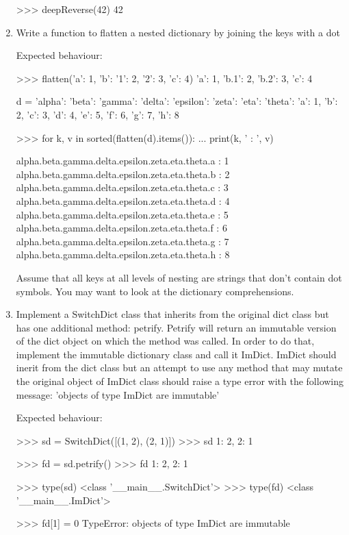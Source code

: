 \documentclass[]{article}
\begin{document}
\begin{enumerate}
>>> deepReverse(42)
42

\item

Write a function to flatten a nested dictionary by joining the keys with a dot

Expected behaviour:

>>> flatten({'a': 1, 'b': {'1': 2, '2': 3}, 'c': 4})
{'a': 1, 'b.1': 2, 'b.2': 3, 'c': 4}

d = {'alpha': 
      {'beta': 
        {'gamma': 
          {'delta': 
            {'epsilon': 
              {'zeta': 
                {'eta': 
                  {'theta': 
                    {'a': 1, 'b': 2, 'c': 3, 'd': 4, 'e': 5, 'f': 6, 'g': 7, 'h': 8}}}}}}}}}
                    
>>> for k, v in sorted(flatten(d).items()): 
... print(k, ' : ', v) 

alpha.beta.gamma.delta.epsilon.zeta.eta.theta.a : 1
alpha.beta.gamma.delta.epsilon.zeta.eta.theta.b : 2
alpha.beta.gamma.delta.epsilon.zeta.eta.theta.c : 3
alpha.beta.gamma.delta.epsilon.zeta.eta.theta.d : 4
alpha.beta.gamma.delta.epsilon.zeta.eta.theta.e : 5
alpha.beta.gamma.delta.epsilon.zeta.eta.theta.f : 6
alpha.beta.gamma.delta.epsilon.zeta.eta.theta.g : 7
alpha.beta.gamma.delta.epsilon.zeta.eta.theta.h : 8


Assume that all keys at all levels of nesting are strings that don't contain dot symbols.
You may want to look at the dictionary comprehensions.

\item
Implement a SwitchDict class that inherits from the original dict class but has one additional method: petrify. Petrify will return an immutable version of the dict object on which the method was called. In order to do that, implement the immutable dictionary class and call it ImDict. ImDict should inerit from the dict class but an attempt to use any method that may mutate the original object of ImDict class should raise a type error with the following message: 'objects of type ImDict are immutable'

Expected behaviour:

>>> sd = SwitchDict([(1, 2), (2, 1)])
>>> sd
{1: 2, 2: 1}

>>> fd = sd.petrify()
>>> fd
{1: 2, 2: 1}

>>> type(sd)
<class '__main__.SwitchDict'>
>>> type(fd)
<class '__main__.ImDict'>

>>> fd[1] = 0
TypeError: objects of type ImDict are immutable



\end{enumerate}
\end{document}
